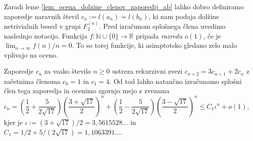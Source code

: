 Zaradi leme \ref{lem_ocena_dolzine_clenov_zaporedij_ab} lahko dobro definiramo zaporedje naravnih števil $c_n := l(a_n) = l(b_n)$, ki nam podaja dolžine netrivialnih besed v grupi $F_2^{(n)}$.
 Pred izračunom splošnega člena uvedimo naslednjo notacijo. Funkcija $f : \mathbb{N} \cup \{ 0 \} \to \mathbb{R}$ pripada \emph{razredu $o(1)$}, če je $\lim_{n \to \infty} f(n) / n  = 0$. To so torej funkcije, ki asimptotsko gledano
 zelo malo vplivajo na oceno. 
\begin{lema}
\label{lem_vrednost_cn}
Zaporedje $c_n$ za vsako število $n \ge 0$ ustreza rekurzivni zvezi $c_{n+2} = 3 c_{n+1} + 2c_{n}$ z začetnima členoma $c_0 = 1$ in $c_1 = 4$. Od tod lahko natančno izračunamo splošni člen tega zaporedja in ocenimo zgornjo mejo z zvezama \begin{equation*}
c_{n} = \left( \frac{1}{2} + \frac{5}{2 \sqrt{17}} \right) \left( \frac{3 + \sqrt{17} }{2} \right)^{n} +  \left( \frac{1}{2} - \frac{5}{2 \sqrt{17}} \right) \left( \frac{3 - \sqrt{17} }{2} \right)^{n} \le C_1 \iota^{n} + o(1),
\end{equation*}
kjer je $\iota := (3 + \sqrt{17} ) / 2 = 3{,}5615528 \ldots $ in $C_1 = 1/ 2 + 5 / (2 \sqrt{17} ) = 1{,}1063391 \ldots$. 
\end{lema}  
